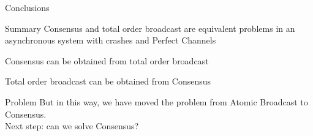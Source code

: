 \begin{frame}{Conclusions}

\begin{block}{Summary}
Consensus and total order broadcast are equivalent problems in an asynchronous system with crashes and Perfect Channels

\BIL
\item Consensus can be obtained from total order broadcast
\item Total order broadcast can be obtained from Consensus
\EIL
\end{block}

\begin{block}{Problem}
But in this way, we have moved the problem from Atomic Broadcast to Consensus.\\
Next step: can we solve Consensus?
\end{block}
 
\end{frame}



\begin{RMFrame}

\BI
\item {}
\EI

\end{RMFrame}



